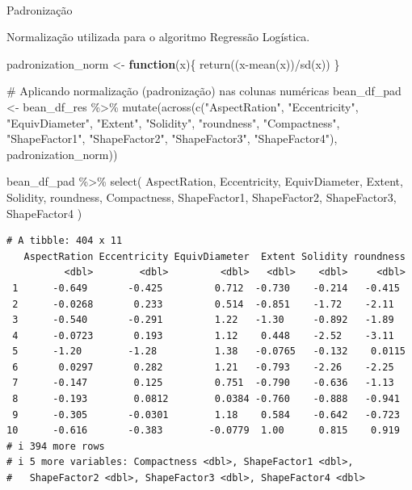 \documentclass[
  letterpaper,
  DIV=11,
  numbers=noendperiod]{scrartcl}
\makeatletter
\let\oldparagraph\paragraph
\renewcommand{\paragraph}{
    \@ifstar
      \xxxParagraphStar
      \xxxParagraphNoStar
  }
\newcommand{\xxxParagraphStar}[1]{\oldparagraph*{#1}\mbox{}}
\newcommand{\xxxParagraphNoStar}[1]{\oldparagraph{#1}\mbox{}}
\newenvironment{Shaded}{\begin{snugshade}}{\end{snugshade}}
\newcommand{\CommentTok}[1]{\textcolor[rgb]{0.37,0.37,0.37}{#1}}
\newcommand{\ControlFlowTok}[1]{\textcolor[rgb]{0.00,0.23,0.31}{\textbf{#1}}}
\newcommand{\FunctionTok}[1]{\textcolor[rgb]{0.28,0.35,0.67}{#1}}
\newcommand{\NormalTok}[1]{\textcolor[rgb]{0.00,0.23,0.31}{#1}}
\newcommand{\OtherTok}[1]{\textcolor[rgb]{0.00,0.23,0.31}{#1}}
\newcommand{\SpecialCharTok}[1]{\textcolor[rgb]{0.37,0.37,0.37}{#1}}
\newcommand{\StringTok}[1]{\textcolor[rgb]{0.13,0.47,0.30}{#1}}
\makeatother
\begin{document}
\paragraph{Padronização}\label{padronizauxe7uxe3o}

Normalização utilizada para o algoritmo Regressão Logística.

\begin{Shaded}
\begin{Highlighting}[]
\NormalTok{padronization\_norm }\OtherTok{\textless{}{-}} \ControlFlowTok{function}\NormalTok{(x)\{}
  \FunctionTok{return}\NormalTok{((x}\SpecialCharTok{{-}}\FunctionTok{mean}\NormalTok{(x))}\SpecialCharTok{/}\FunctionTok{sd}\NormalTok{(x))}
\NormalTok{\}}

\CommentTok{\# Aplicando normalização (padronização) nas colunas numéricas}
\NormalTok{bean\_df\_pad }\OtherTok{\textless{}{-}}\NormalTok{ bean\_df\_res }\SpecialCharTok{\%\textgreater{}\%} 
  \FunctionTok{mutate}\NormalTok{(}\FunctionTok{across}\NormalTok{(}\FunctionTok{c}\NormalTok{(}\StringTok{"AspectRation"}\NormalTok{, }\StringTok{"Eccentricity"}\NormalTok{, }\StringTok{"EquivDiameter"}\NormalTok{, }\StringTok{"Extent"}\NormalTok{, }\StringTok{"Solidity"}\NormalTok{, }\StringTok{"roundness"}\NormalTok{, }\StringTok{"Compactness"}\NormalTok{, }\StringTok{"ShapeFactor1"}\NormalTok{, }\StringTok{"ShapeFactor2"}\NormalTok{, }\StringTok{"ShapeFactor3"}\NormalTok{, }\StringTok{"ShapeFactor4"}\NormalTok{), padronization\_norm))}

\NormalTok{bean\_df\_pad }\SpecialCharTok{\%\textgreater{}\%} 
  \FunctionTok{select}\NormalTok{(}
\NormalTok{    AspectRation, }
\NormalTok{    Eccentricity, }
\NormalTok{    EquivDiameter, }
\NormalTok{    Extent, }
\NormalTok{    Solidity, }
\NormalTok{    roundness, }
\NormalTok{    Compactness, }
\NormalTok{    ShapeFactor1, }
\NormalTok{    ShapeFactor2, }
\NormalTok{    ShapeFactor3, }
\NormalTok{    ShapeFactor4}
\NormalTok{  )}
\end{Highlighting}
\end{Shaded}

\begin{verbatim}
# A tibble: 404 x 11
   AspectRation Eccentricity EquivDiameter  Extent Solidity roundness
          <dbl>        <dbl>         <dbl>   <dbl>    <dbl>     <dbl>
 1      -0.649       -0.425         0.712  -0.730    -0.214   -0.415 
 2      -0.0268       0.233         0.514  -0.851    -1.72    -2.11  
 3      -0.540       -0.291         1.22   -1.30     -0.892   -1.89  
 4      -0.0723       0.193         1.12    0.448    -2.52    -3.11  
 5      -1.20        -1.28          1.38   -0.0765   -0.132    0.0115
 6       0.0297       0.282         1.21   -0.793    -2.26    -2.25  
 7      -0.147        0.125         0.751  -0.790    -0.636   -1.13  
 8      -0.193        0.0812        0.0384 -0.760    -0.888   -0.941 
 9      -0.305       -0.0301        1.18    0.584    -0.642   -0.723 
10      -0.616       -0.383        -0.0779  1.00      0.815    0.919 
# i 394 more rows
# i 5 more variables: Compactness <dbl>, ShapeFactor1 <dbl>,
#   ShapeFactor2 <dbl>, ShapeFactor3 <dbl>, ShapeFactor4 <dbl>
\end{verbatim}
\end{document}
